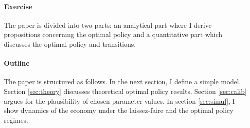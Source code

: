 \paragraph{Exercise}
The paper is divided into two parts: an analytical part where I derive propositions concerning the optimal policy and a quantitative part which discusses the optimal policy and transitions. 

\paragraph{Outline}
The paper is structured as follows. In the next section, I define a simple model. %
Section \ref{sec:theory} discusses theoretical optimal policy results. Section \ref{sec:calib} argues for the plausibility of chosen parameter values. In section \ref{sec:simul}, I show dynamics of the economy under the laissez-faire and the optimal policy regimes. 

